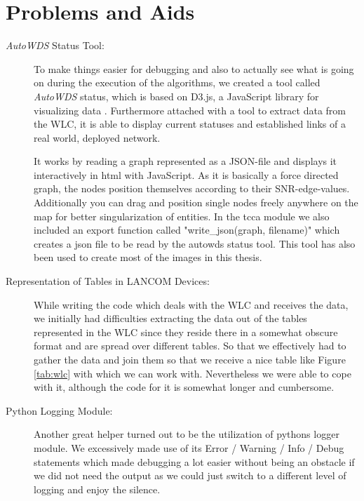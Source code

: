   \section{Problems and Aids}
    \begin{description}
    \item [\textit{AutoWDS} Status Tool:]
      To make things easier for debugging and also to actually see what is going on during the execution of the algorithms,
      we created a tool called \textit{AutoWDS} status, which is based on D3.js, a JavaScript library for visualizing data \cite{d3js}.
      Furthermore attached with a tool to extract data from the \ac{WLC}, it is able to display current statuses and established links of a real world, deployed network.
      
      It works by reading a graph represented as a \ac{JSON}-file and displays it interactively in html with JavaScript.
      As it is basically a force directed graph, the nodes position themselves according to their \ac{SNR}-edge-values. 
      Additionally you can drag and position single nodes freely anywhere on the map for better singularization of entities.
      In the tcca module we also included an export function called "write\_json(graph, filename)" which creates a json file to be read by the autowds status tool.
      This tool has also been used to create most of the images in this thesis.

    \item [Representation of Tables in LANCOM Devices:]
      While writing the code which deals with the \ac{WLC} and receives the data, 
      we initially had difficulties extracting the data out of the tables represented in the \ac{WLC} since
      they reside there in a somewhat obscure format and are spread over different tables. So that we effectively had to gather the data and join them so that we receive a
      nice table like Figure \ref{tab:wlc} with which we can work with. 
      Nevertheless we were able to cope with it, although the code for it is somewhat longer and cumbersome.

    \item [Python Logging Module:]
      Another great helper turned out to be the utilization of pythons logger module. 
      We excessively made use of its Error / Warning / Info / Debug statements which made debugging
      a lot easier without being an obstacle if we did not need the output as we could just switch to a different level of logging and enjoy the silence.
    

\end{description}
